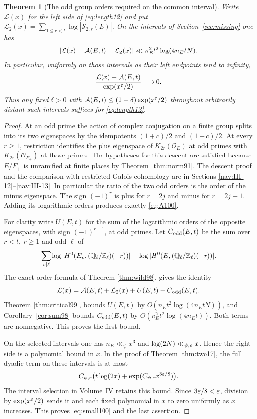 \documentclass[a4paper,11pt]{article}
\newtheorem{theorem}[proposition]{Theorem}
\theoremstyle{definition}
\theoremstyle{remark}
\newcommand{\ZZ}{\mathbb Z}\newcommand{\ord}{\operatorname{ord}}
\numberwithin{equation}{section}
\begin{document}
\begin{theorem}[The odd group orders required on the common interval]
\label{thm:res100}
Write \(\mathcal L(x)\) for the left side of \eqref{eq:length12}
and put \(\mathcal L_2(x)=\sum_{1\le r<t}\log|\mathcal S_{2,r}(E)|\).
On the intervals of Section~\ref{sec:missing} one has
\[
 \left|\mathcal L(x)-{\cal A}(E,t)-\mathcal L_2(x)\right|
                 \ll n_E^2t^2\log(4n_EtN).
\]
In particular, uniformly on those intervals as their left endpoints
tend to infinity,
\begin{equation}
        \frac{\mathcal L(x)-{\cal A}(E,t)}{\exp(x^\varepsilon/2)}
                        \longrightarrow 0.                       \label{eq:small100}
\end{equation}
Thus any fixed \(\delta>0\) with
\({\cal A}(E,t)\le (1-\delta)\exp(x^\varepsilon/2)\) throughout
arbitrarily distant such intervals suffices for \eqref{eq:length12}.
\end{theorem}
\begin{proof}
At an odd prime the action of complex conjugation on a finite
group splits into its two eigenspaces by the idempotents
\((1+c)/2\) and \((1-c)/2\). At every \(r\ge1\), restriction
identifies the plus eigenspace of
\(K_{2r}(\mathcal O_E)\) at odd primes with
\(K_{2r}(\mathcal O_{F_+})\) at those primes. The hypotheses for
this descent are satisfied because \(E/F_+\) is unramified at
finite places by Theorem~\ref{thm:norm91}. The descent proof and
the comparison with restricted Galois cohomology are in
Sections \ref{nav:III-12}--\ref{nav:III-13}.
In particular the ratio of the two odd orders is the order of the
minus eigenspace. The sign \((-1)^r\) is plus for \(r=2j\) and
minus for \(r=2j-1\). Adding its logarithmic orders produces
exactly \eqref{eq:A100}.

For clarity write \(U(E,t)\) for the sum of the logarithmic orders
of the opposite eigenspaces, with sign \((-1)^{r+1}\), at odd
primes. Let \(C_{\rm odd}(E,t)\) be the sum over \(r<t,\ r\ge1\)
and odd \(\ell\) of
\[
   \sum_{v\mid\ell}\log |H^0(E_v,(\QQ_\ell/\ZZ_\ell)(-r))|
            -\log |H^0(E,(\QQ_\ell/\ZZ_\ell)(-r))|.
\]
The exact order formula of Theorem \ref{thm:wild98}, gives the
identity
\[
       \mathcal L(x)={\cal A}(E,t)+\mathcal L_2(x)
                                  +U(E,t)-C_{\rm odd}(E,t).
\]
Theorem \ref{thm:critical99}, bounds \(U(E,t)\) by
\(O(n_Et^2\log(4n_EtN))\), and Corollary~\ref{cor:sum98} bounds
\(C_{\rm odd}(E,t)\) by \(O(n_E^2t^2\log(4n_Et))\).
Both terms are nonnegative. This proves the first bound.

On the selected intervals one has \(n_E\ll_\psi x^3\) and
\(\log(2N)\ll_{\psi,\varepsilon}x\). Hence the right side is a
polynomial bound in \(x\). In the proof of
Theorem \ref{thm:two17},
the full dyadic term on these intervals is at most
\[
   C_{\psi,\varepsilon}\bigl(t\log(2x)+\exp(C_{\psi,\varepsilon}x^{3\varepsilon/8})\bigr).
\]
The interval selection in
\hyperref[nav:volume-IV]{Volume~IV} retains this
bound. Since \(3\varepsilon/8<\varepsilon\), division by \(\exp(x^\varepsilon/2)\)
sends it and each fixed polynomial in \(x\) to zero uniformly
as \(x\) increases. This proves \eqref{eq:small100} and the last
assertion.
\end{proof}
\end{document}
